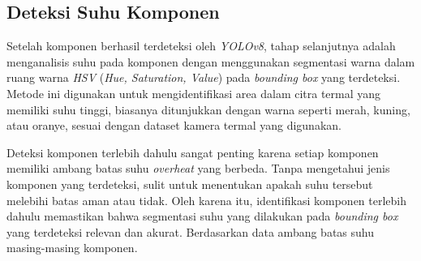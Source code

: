 \subsection{Deteksi Suhu Komponen}
Setelah komponen berhasil terdeteksi oleh \emph{YOLOv8}, tahap selanjutnya adalah menganalisis suhu pada komponen dengan menggunakan segmentasi warna dalam ruang warna \emph{HSV} (\emph{Hue, Saturation, Value}) pada \emph{bounding box} yang terdeteksi. Metode ini digunakan untuk mengidentifikasi area dalam citra termal yang memiliki suhu tinggi, biasanya ditunjukkan dengan warna seperti merah, kuning, atau oranye, sesuai dengan dataset kamera termal yang digunakan.

Deteksi komponen terlebih dahulu sangat penting karena setiap komponen memiliki ambang batas suhu \emph{overheat} yang berbeda. Tanpa mengetahui jenis komponen yang terdeteksi, sulit untuk menentukan apakah suhu tersebut melebihi batas aman atau tidak. Oleh karena itu, identifikasi komponen terlebih dahulu memastikan bahwa segmentasi suhu yang dilakukan pada \emph{bounding box} yang terdeteksi relevan dan akurat. Berdasarkan data ambang batas suhu masing-masing komponen.

